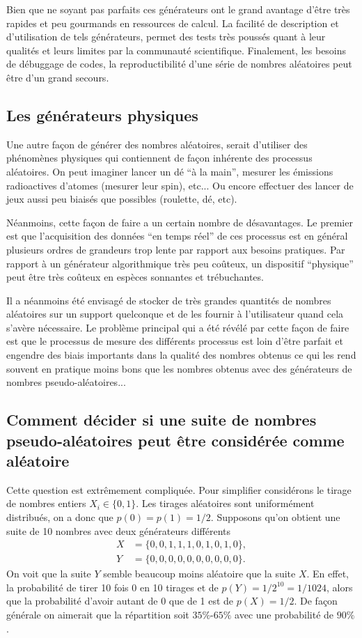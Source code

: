\documentclass[a4paper,12pt]{book}
\begin{document}
Bien que ne soyant pas parfaits ces générateurs ont le grand avantage d'être très rapides et peu
gourmands en ressources de calcul. La facilité de description et d'utilisation
de tels  générateurs, permet des tests très poussés quant à leur qualités et leurs limites
par la communauté scientifique. Finalement, les besoins de débuggage de codes,
la reproductibilité d'une série de nombres aléatoires
peut être d'un grand secours. 

\subsection{Les générateurs physiques}

Une autre façon de générer des nombres aléatoires, serait d'utiliser des phénomènes physiques
qui contiennent de façon inhérente des processus aléatoires. On peut imaginer 
lancer un dé ``à la main'', mesurer les émissions radioactives d'atomes (mesurer leur spin), 
etc... Ou encore effectuer des lancer de jeux aussi peu biaisés que possibles (roulette, dé, etc).

Néanmoins, cette façon de faire a un certain nombre de désavantages. Le premier
est que l'acquisition des données ``en temps réel'' de ces processus est en général plusieurs
ordres de grandeurs trop lente par rapport aux besoins pratiques. Par rapport à un générateur algorithmique
très peu coûteux, un dispositif ``physique'' peut être très coûteux en espèces sonnantes et trébuchantes.

Il a néanmoins été envisagé de stocker de très grandes quantités de nombres aléatoires
sur un support quelconque et de les fournir à l'utilisateur quand cela s'avère nécessaire.
Le problème principal qui a été révélé par cette façon de faire est que le processus de mesure
des différents processus est loin d'être parfait et engendre des biais importants 
dans la qualité des nombres obtenus ce qui les rend souvent en pratique moins bons que 
les nombres obtenus avec des générateurs de nombres pseudo-aléatoires...

\subsection{Comment décider si une suite de nombres pseudo-aléatoires peut 
être considérée comme aléatoire}

Cette question est extrêmement compliquée. Pour simplifier considérons le tirage de nombres 
entiers $X_i\in \{0,1\}$. Les tirages aléatoires sont uniformément distribués,
on a donc que $p(0)=p(1)=1/2$. Supposons qu'on obtient une suite de 10 nombres 
avec deux générateurs différents
\begin{align}
 X&=\{0,0,1,1,1,0,1,0,1,0\},\\
 Y&=\{0,0,0,0,0,0,0,0,0,0\}.
\end{align}
On voit que la suite $Y$ semble beaucoup moins aléatoire que la suite $X$. 
En effet, la probabilité de tirer 10 fois 0 en 10 tirages et de $p(Y)=1/2^{10}=1/1024$,
alors que la probabilité d'avoir autant de 0 que de 1 est de $p(X)=1/2$.
De façon générale on aimerait que la répartition soit $35\%$-$65\%$ avec une probabilité
de $90\%$.
\end{document}
